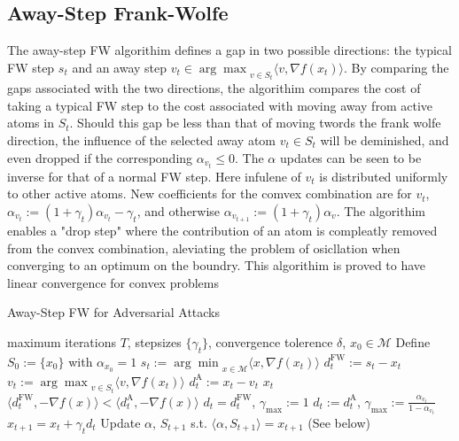 \documentclass{article}
\begin{document}
\subsection{Away-Step Frank-Wolfe}
The away-step FW algorithim defines a gap in two possible directions: the typical FW step $s_t$ and an away step $v_t  \in {\arg \max}_{v\in S_t} \langle v, \nabla f(x_t)\rangle$. By comparing the gaps associated with the two directions, the algorithim compares the cost of taking a typical FW step to the cost associated with moving away from active atoms in $S_t$. Should this gap be less than that of moving twords the frank wolfe direction, the influence of the selected away atom $v_t\in S_t$ will be deminished, and even dropped if the corresponding $\alpha_{v_t} \leq 0$. 
The $\alpha$ updates can be seen to be inverse for that of a normal FW step. Here infulene of $v_t$ is distributed uniformly to other active atoms. New coefficients for the comvex combination are for $v_t$, $\alpha_{v_{t}} := (1+\gamma_t)\alpha_{v_t} - \gamma_t$, and otherwise $\alpha_{v_{t+1}} := (1+\gamma_t)\alpha_{v}$. 
The algorithim enables a "drop step" where the contribution of an atom is compleatly removed from the convex combination, aleviating the problem of osicllation when converging to an optimum on the boundry. 
This algorithim is proved to have linear convergence for convex problems
\begin{algorithm}
\caption{Away-Step FW for Adversarial Attacks}\label{alg:cap}
\begin{algorithmic}[1]
\Require maximum iterations $T$, stepsizes $\{\gamma_t\}$, convergence tolerence $\delta$, $x_0 \in \mathcal{M}$
\State Define $S_0 := \{x_0\}$ with $\alpha_{x_0} = 1$
	\State $s_t  := {\arg \min}_{x\in\mathcal{M}} \langle x, \nabla f(x_t)\rangle$ 
	\State $d_t^{\text{FW}} := s_t - x_t$
	\State $v_t  := {\arg \max}_{v\in S_t} \langle v, \nabla f(x_t)\rangle$
	\State $d_t^{\text{A}} := x_t - v_t$
	  $x_t$ \hfill {}
	\EndIf
	\If $\langle d_t^\text{FW}, -\nabla f(x)\rangle < \langle d_t^\text{A}, -\nabla f(x)\rangle$
		\State $d_t = d_t^\text{FW}$, $\gamma_\text{max} := 1$
	\Else
		\State $d_t := d_t^\text{A}$, $\gamma_\text{max} := \frac{\alpha_{v_t}}{1- \alpha_{v_t}}$
	\EndIf
	\State $x_{t+1} = x_t + \gamma_t d_t$
	\State Update $\alpha$, $S_{t+1}$ s.t. $\langle \alpha, S_{t+1}\rangle = x_{t+1}$ (See below)
\EndFor
\end{algorithmic}
\end{algorithm}
\end{document}
